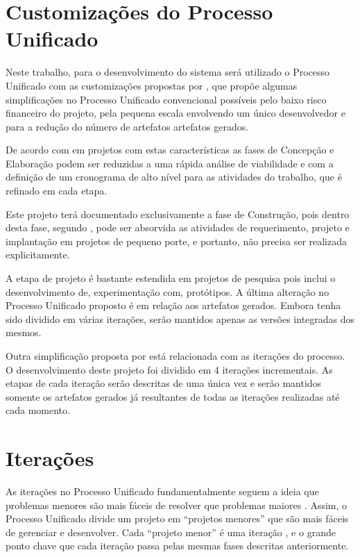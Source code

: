 \section{Customizações do Processo Unificado}

Neste trabalho, para o desenvolvimento do sistema será utilizado o Processo Unificado com as customizações propostas por , que propõe algumas simplificações no Processo Unificado convencional possíveis pelo baixo risco financeiro do projeto, pela pequena escala envolvendo um único desenvolvedor e para a redução do número de artefatos artefatos gerados.

De acordo com  em projetos com estas características as fases de Concepção e Elaboração podem ser reduzidas a uma rápida análise de viabilidade e com a definição de um cronograma de alto nível para as atividades do trabalho, que é refinado em cada etapa.

Este projeto terá documentado exclusivamente a fase de Construção, pois dentro desta fase, segundo , pode ser absorvida as atividades de requerimento, projeto e implantação em projetos de pequeno porte, e portanto, não precisa ser realizada explicitamente.

A etapa de projeto é bastante estendida em projetos de pesquisa pois inclui o desenvolvimento de, experimentação com, protótipos. A última alteração no Processo Unificado proposto é em relação aos artefatos gerados. Embora tenha sido dividido em várias iterações, serão mantidos apenas as versões integradas dos mesmos.

Outra simplificação proposta por  está relacionada com as iterações do processo. O desenvolvimento deste projeto foi dividido em 4 iterações incrementais. As etapas de cada iteração serão descritas de uma única vez e serão mantidos somente os artefatos gerados já resultantes de todas as iterações realizadas até cada momento.


\section{Iterações}

As iterações no Processo Unificado fundamentalmente seguem a ideia que problemas menores são mais fáceis de resolver que problemas maiores \cite{arlow:2002}. Assim, o Processo Unificado divide um projeto em ``projetos menores'' que são mais fáceis de gerenciar e desenvolver. Cada ``projeto menor'' é uma iteração \cite{arlow:2002}, e o grande ponto chave que cada iteração passa pelas mesmas fases descritas anteriormente.

